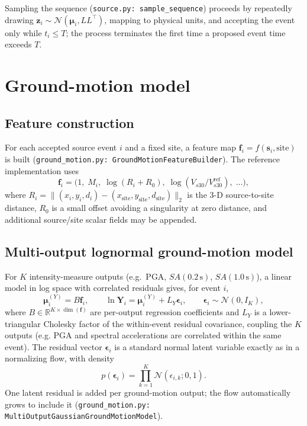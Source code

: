 \documentclass[11pt]{article}
\newcommand{\R}{\mathbb{R}}
\newcommand{\Normal}{\mathcal{N}}
\newcommand{\bs}{\mathbf s}
\newcommand{\bz}{\mathbf z}
\begin{document}
Sampling the sequence (\texttt{source.py: sample\_sequence}) proceeds by
repeatedly drawing $\bz_i \sim \Normal(\bm\mu_i, LL^\top)$, mapping to
physical units, and accepting the event only while $t_i \le T$; the process
terminates the first time a proposed event time exceeds $T$.

\section{Ground-motion model}

\subsection{Feature construction}

For each accepted source event $i$ and a fixed site, a feature map
$\bm f_i = f(\bs_i, \text{site})$ is built (\texttt{ground\_motion.py:
GroundMotionFeatureBuilder}). The reference implementation uses
\begin{equation}
\bm f_i = \big(1,\; M_i,\; \log(R_i + R_0),\; \log(V_{s30}/V_{s30}^{\mathrm{ref}}),\; \dots \big),
\end{equation}
where $R_i = \lVert (x_i,y_i,d_i) - (x_{\mathrm{site}}, y_{\mathrm{site}}, d_{\mathrm{site}}) \rVert_2$
is the 3-D source-to-site distance, $R_0$ is a small offset avoiding a
singularity at zero distance, and additional source/site scalar fields may be
appended.

\subsection{Multi-output lognormal ground-motion model}

For $K$ intensity-measure outputs (e.g.\ PGA, $SA(0.2\,\mathrm{s})$,
$SA(1.0\,\mathrm{s})$), a linear model in log space with correlated residuals
gives, for event $i$,
\begin{equation}
\bm\mu_i^{(Y)} = B\bm f_i, \qquad
\ln \bm Y_i = \bm\mu_i^{(Y)} + L_Y \bm\epsilon_i, \qquad
\bm\epsilon_i \sim \Normal(0, I_K),
\label{eq:gmm}
\end{equation}
where $B \in \R^{K\times \dim(\bm f)}$ are per-output regression
coefficients and $L_Y$ is a lower-triangular Cholesky factor of the
within-event residual covariance, coupling the $K$ outputs (e.g. PGA and
spectral accelerations are correlated within the same event). The residual
vector $\bm\epsilon_i$ is a standard normal latent variable exactly as in a
normalizing flow, with density
\begin{equation}
p(\bm\epsilon_i) = \prod_{k=1}^K \Normal(\epsilon_{i,k}; 0, 1).
\label{eq:gmm-density}
\end{equation}
One latent residual is added per ground-motion output; the flow automatically
grows to include it (\texttt{ground\_motion.py:
MultiOutputGaussianGroundMotionModel}).
\end{document}
